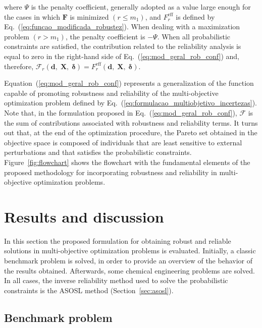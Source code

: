 \documentclass[final,5p,times,twocolumn,numbers]{elsarticle}
\newcommand{\vect}[1]{\mathbf{\boldsymbol{#1}}}
\begin{document}
\noindent where $ \Psi $ is the penalty coefficient, generally adopted as a value large enough for the cases in which $ \mathbf{F} $ is minimized $ \left( r \leq m_{1} \right) $, and $ F_{r}^{\mathrm{eff}} $ is defined by Eq.~(\ref{eq:funcao_modificada_robustez}). When dealing with a maximization problem $ \left( r > m_{1} \right) $, the penalty coefficient is $ -\Psi $. When all probabilistic constraints are satisfied, the contribution related to the reliability analysis is equal to zero in the right-hand side of Eq.~(\ref{eq:mod_geral_rob_conf}) and, therefore, $ \mathcal{F}_{r} \left( \mathbf{d}, \; \mathbf{X}, \; \vect{\delta} \right) = F_{r}^{\mathrm{eff}} \left( \mathbf{d}, \; \mathbf{X}, \; \vect{\delta} \right) $.

Equation~(\ref{eq:mod_geral_rob_conf}) represents a generalization of the function capable of promoting robustness and reliability of the multi-objective optimization problem defined by Eq.~(\ref{eq:formulacao_multiobjetivo_incertezas}). Note that, in the formulation proposed in Eq.~(\ref{eq:mod_geral_rob_conf}), $ \mathbf{\mathcal{F}} $ is the sum of contributions associated with robustness and reliability terms. It turns out that, at the end of the optimization procedure, the Pareto set obtained in the objective space is composed of individuals that are least sensitive to external perturbations and that satisfies the probabilistic constraints. Figure~\ref{fig:flowchart} shows the flowchart with the fundamental elements of the proposed methodology for incorporating robustness and reliability in multi-objective optimization problems.

\section{Results and discussion} \label{sec:results}

In this section the proposed formulation for obtaining robust and reliable solutions in multi-objective optimization problems is evaluated. Initially, a classic benchmark problem is solved, in order to provide an overview of the behavior of the results obtained. Afterwards, some chemical engineering problems are solved. In all cases, the inverse reliability method used to solve the probabilistic constraints is the ASOSL method (Section~\ref{sec:asosl}).

\subsection{Benchmark problem} \label{sec:benchmark_prob}
\end{document}
